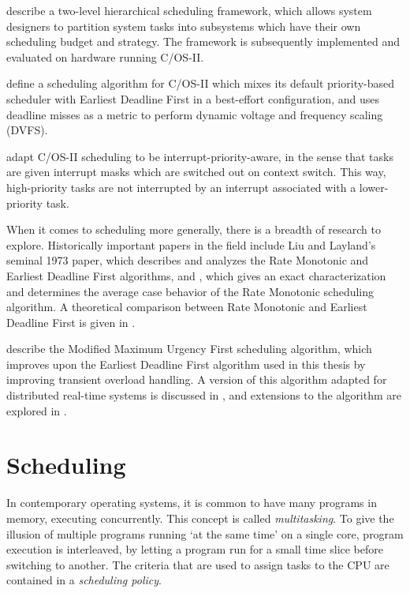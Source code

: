 \documentclass[twoside]{uva-inf-bachelor-thesis}
\newcommand{\ucosii}{\textmu C/OS-II\xspace}
\begin{document}
\textcite{tue:hfs} describe a two-level hierarchical scheduling framework, which allows system designers to partition system tasks into subsystems which have their own scheduling budget and strategy. The framework is subsequently implemented and evaluated on hardware running \ucosii.

\textcite{Cho2011} define a scheduling algorithm for \ucosii which mixes its default priority-based scheduler with Earliest Deadline First in a best-effort configuration, and uses deadline misses as a metric to perform dynamic voltage and frequency scaling (DVFS).

\textcite{dodiu2010} adapt \ucosii scheduling to be interrupt-priority-aware, in the sense that tasks are given interrupt masks which are switched out on context switch. This way, high-priority tasks are not interrupted by an interrupt associated with a lower-priority task.

When it comes to scheduling more generally, there is a breadth of research to explore.
Historically important papers in the field include Liu and Layland's seminal 1973 paper\cite{Liu1973}, which describes and analyzes the Rate Monotonic and Earliest Deadline First algorithms, and \textcite{Lehoczky1989}, which gives an exact characterization and determines the average case behavior of the Rate Monotonic scheduling algorithm. A theoretical comparison between Rate Monotonic and Earliest Deadline First is given in \textcite{Buttazzo2005}.

\textcite{salmani2005modified} describe the Modified Maximum Urgency First scheduling algorithm, which improves upon the Earliest Deadline First algorithm used in this thesis by improving transient overload handling. A version of this algorithm adapted for distributed real-time systems is discussed in \textcite{chen2006flexible}, and extensions to the algorithm are explored in \textcite{behera2012enhanced}.

%
%
%
%

\chapter{Scheduling}
In contemporary operating systems, it is common to have many programs in memory, executing concurrently. This concept is called \textit{multitasking}. To give the illusion of multiple programs running `at the same time' on a single core, program execution is interleaved, by letting a program run for a small time slice before switching to another. The criteria that are used to assign tasks to the CPU are contained in a \textit{scheduling policy}.
\end{document}
